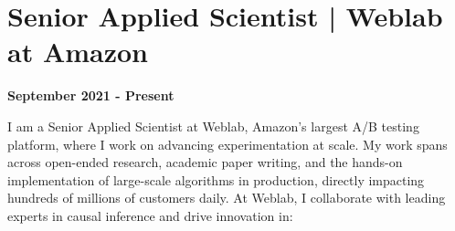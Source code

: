 \documentclass[10pt, a4paper]{article}
\begin{document}

\section*{Senior Applied Scientist | Weblab at Amazon}
\textbf{September 2021 - Present}

I am a Senior Applied Scientist at Weblab, Amazon’s largest A/B testing platform, where I work on advancing experimentation at scale. My work spans across open-ended research, academic paper writing, and the hands-on implementation of large-scale algorithms in production, directly impacting hundreds of millions of customers daily. At Weblab, I collaborate with leading experts in causal inference and drive innovation in:
\end{document}
